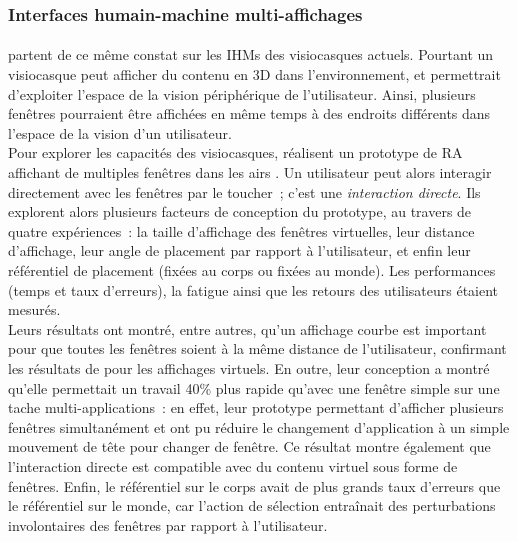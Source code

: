 \subsubsection*{Interfaces humain-machine multi-affichages}

\paragraph*{}
\citet{EnsFinneganIrani2014} partent de ce même constat sur les IHMs des visiocasques actuels. Pourtant un visiocasque peut afficher du contenu en 3D dans l'environnement, et permettrait d'exploiter l'espace de la vision périphérique de l'utilisateur. Ainsi, plusieurs fenêtres pourraient être affichées en même temps à des endroits différents dans l'espace de la vision d'un utilisateur.\\
Pour explorer les capacités des visiocasques, \citeauthor{EnsFinneganIrani2014} réalisent un prototype de RA affichant de multiples fenêtres dans les airs . Un utilisateur peut alors interagir directement avec les fenêtres par le toucher~; c'est une \emph{interaction directe}. Ils explorent alors plusieurs facteurs de conception du prototype, au travers de quatre expériences~: la taille d'affichage des fenêtres virtuelles, leur distance d'affichage, leur angle de placement par rapport à l'utilisateur, et enfin leur référentiel de placement (fixées au corps ou fixées au monde). Les performances (temps et taux d'erreurs), la fatigue ainsi que les retours des utilisateurs étaient mesurés.\\ 
Leurs résultats ont montré, entre autres, qu'un affichage courbe est important pour que toutes les fenêtres soient à la même distance de l'utilisateur, confirmant les résultats de \citet{ShuppBallYostEtAl2006} pour les affichages virtuels. En outre, leur conception a montré qu'elle permettait un travail 40\% plus rapide qu'avec une fenêtre simple sur une tache multi-applications~: en effet, leur prototype permettant d'afficher plusieurs fenêtres simultanément et \citeauthor{EnsFinneganIrani2014} ont pu réduire le changement d'application à un simple mouvement de tête pour changer de fenêtre. Ce résultat montre également que l'interaction directe est compatible avec du contenu virtuel sous forme de fenêtres. Enfin, le référentiel sur le corps avait de plus grands taux d'erreurs que le référentiel sur le monde, car l'action de sélection entraînait des perturbations involontaires des fenêtres par rapport à l'utilisateur.\\ 
